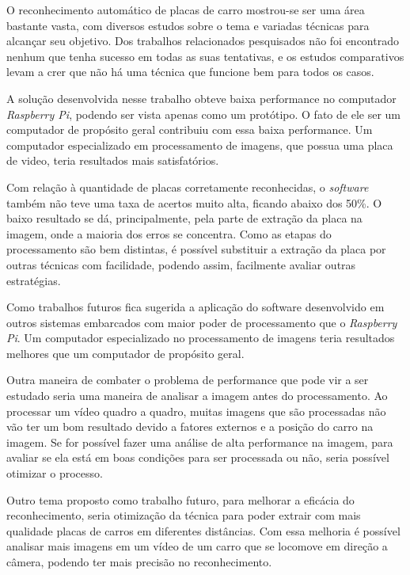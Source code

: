 O reconhecimento automático de placas de carro mostrou-se ser uma área bastante vasta, com diversos estudos sobre o tema e variadas técnicas para alcançar seu objetivo. Dos trabalhos relacionados pesquisados não foi encontrado nenhum que tenha sucesso em todas as suas tentativas, e os estudos comparativos levam a crer que não há uma técnica que funcione bem para todos os casos. 

A solução desenvolvida nesse trabalho obteve baixa performance no computador \emph{Raspberry Pi}, podendo ser vista apenas como um protótipo. O fato de ele ser um computador de propósito geral contribuiu com essa baixa performance. Um computador especializado em processamento de imagens, que possua uma placa de video, teria resultados mais satisfatórios.

Com relação à quantidade de placas corretamente reconhecidas, o \emph{software} também não teve uma taxa de acertos muito alta, ficando abaixo dos 50\%. O baixo resultado se dá, principalmente, pela parte de extração da placa na imagem, onde a maioria dos erros se concentra. Como as etapas do processamento são bem distintas, é possível substituir a extração da placa por outras técnicas com facilidade, podendo assim, facilmente avaliar outras estratégias.

Como trabalhos futuros fica sugerida a aplicação do software desenvolvido em outros sistemas embarcados com maior poder de processamento que o \emph{Raspberry Pi}. Um computador especializado no processamento de imagens teria resultados melhores que um computador de propósito geral.

Outra maneira de combater o problema de performance que pode vir a ser estudado seria uma maneira de analisar a imagem antes do processamento. Ao processar um vídeo quadro a quadro, muitas imagens que são processadas não vão ter um bom resultado devido a fatores externos e a posição do carro na imagem. Se for possível fazer uma análise de alta performance na imagem, para avaliar se ela está em boas condições para ser processada ou não, seria possível otimizar o processo. 

Outro tema proposto como trabalho futuro, para melhorar a eficácia do reconhecimento, seria otimização da técnica para poder extrair com mais qualidade placas de carros em diferentes distâncias. Com essa melhoria é possível analisar mais imagens em um vídeo de um carro que se locomove em direção a câmera, podendo ter mais precisão no reconhecimento.